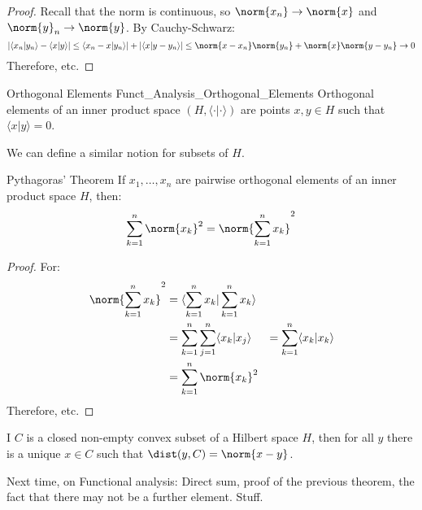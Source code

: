 \documentclass[crop=false,class=book,oneside]{standalone}                      %
\begin{document}
        \begin{proof}
            Recall that the norm is continuous, so
            $\norm{x_{n}}\rightarrow\norm{x}$ and
            $\norm{y}_{n}\rightarrow\norm{y}$. By Cauchy-Schwarz:
            \begin{equation}
                |\langle{x_{n}|y_{n}}\rangle-\langle{x|y}\rangle|
                \leq\langle{x_{n}-x|y_{n}}\rangle|+
                    |\langle{x|y-y_{n}}\rangle|
                \leq\norm{x-x_{n}}\norm{y_{n}}+
                    \norm{x}\norm{y-y_{n}}
                \rightarrow{0}
            \end{equation}
            Therefore, etc.
        \end{proof}
        \begin{ldefinition}{Orthogonal Elements}
              {Funct_Analysis_Orthogonal_Elements}
            Orthogonal elements of an inner product space
            $(H,\langle{\cdot|\cdot}\rangle)$ are points
            $x,y\in{H}$ such that
            $\langle{x|y}\rangle=0$.
        \end{ldefinition}
        We can define a similar notion for subsets of $H$.
        \begin{ltheorem}{Pythagoras' Theorem}
            If $x_{1},\dots,x_{n}$ are pairwise orthogonal
            elements of an inner product space $H$, then:
            \begin{equation}
                \sum_{k=1}^{n}\norm{x_{k}}^{2}=
                \norm{\sum_{k=1}^{n}x_{k}}^{2}
            \end{equation}
        \end{ltheorem}
        \begin{proof}
            For:
            \begin{align}
                \norm{\sum_{k=1}^{n}x_{k}}^{2}
                &=\langle{\sum_{k=1}^{n}x_{k}|\sum_{k=1}^{n}x_{k}}
                    \rangle\\
                &=\sum_{k=1}^{n}\sum_{j=1}^{n}
                    \langle{x_{k}|x_{j}}\rangle
                &=\sum_{k=1}^{n}\langle{x_{k}|x_{k}}\rangle\\
                &=\sum_{k=1}^{n}\norm{x_{k}}^{2}
            \end{align}
            Therefore, etc.
        \end{proof}
        \begin{theorem}
            I $C$ is a closed non-empty convex subset of a Hilbert
            space $H$, then for all $y$ there is a unique
            $x\in{C}$ such that $\dist(y,C)=\norm{x-y}$.
        \end{theorem}
        Next time, on Functional analysis:
        Direct sum, proof of the previous theorem, the fact
        that there may not be a further element. Stuff.
\end{document}
